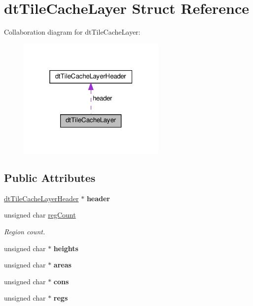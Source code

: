 \hypertarget{structdtTileCacheLayer}{}\section{dt\+Tile\+Cache\+Layer Struct Reference}
\label{structdtTileCacheLayer}


Collaboration diagram for dt\+Tile\+Cache\+Layer\+:
\nopagebreak
\begin{figure}[H]
\begin{center}
\leavevmode
\includegraphics[width=205pt]{structdtTileCacheLayer__coll__graph}
\end{center}
\end{figure}
\subsection*{Public Attributes}
\begin{DoxyCompactItemize}
\item 
\mbox{\label{structdtTileCacheLayer_a5be8456723944576f4011287b5983c61}} 
\hyperlink{structdtTileCacheLayerHeader}{dt\+Tile\+Cache\+Layer\+Header} $\ast$ {\bfseries header}
\item 
\mbox{\label{structdtTileCacheLayer_ab9bd3001111fc4512c2ef7f225a4466d}} 
unsigned char \hyperlink{structdtTileCacheLayer_ab9bd3001111fc4512c2ef7f225a4466d}{reg\+Count}
\begin{DoxyCompactList}\small\item\em Region count. \end{DoxyCompactList}\item 
\mbox{\label{structdtTileCacheLayer_aad0c14bc4a2eb1ee08e0d662e9af42c3}} 
unsigned char $\ast$ {\bfseries heights}
\item 
\mbox{\label{structdtTileCacheLayer_a4ae4368c87643c51aa99bfc94049f234}} 
unsigned char $\ast$ {\bfseries areas}
\item 
\mbox{\label{structdtTileCacheLayer_ab607cf1a1a124e1ec5bde27abe11789e}} 
unsigned char $\ast$ {\bfseries cons}
\item 
\mbox{\label{structdtTileCacheLayer_a9bce622a47964259e0b02632ce2bb761}} 
unsigned char $\ast$ {\bfseries regs}
\end{DoxyCompactItemize}


